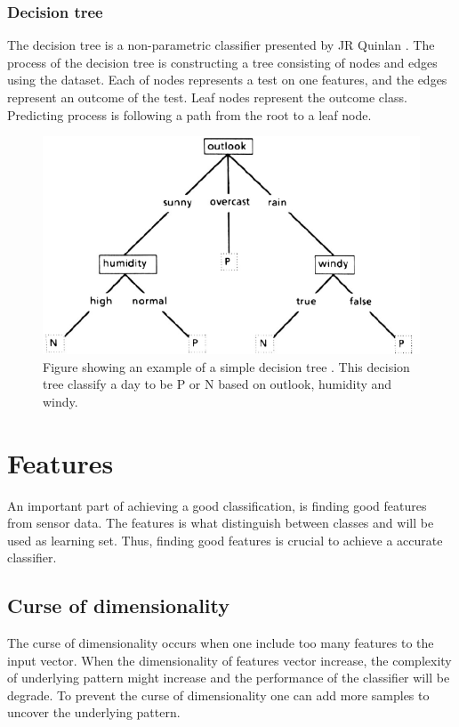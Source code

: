 \documentclass[USenglish]{ifimaster}  %
\begin{document}
	
\subsubsection{Decision tree}
The decision tree is a non-parametric classifier presented by JR Quinlan \cite{Quinlan1986}. The process of the decision tree is constructing a tree consisting of nodes and edges using the dataset. Each of nodes represents a test on one features, and the edges represent an outcome of the test. Leaf nodes represent the outcome class. Predicting process is following a path from the root to a leaf node.
	
	
\begin{figure}[h]
		\centering
		\includegraphics[scale=0.5]{Figures/decisionTree.PNG}
		\caption{Figure showing an example of a simple decision tree \cite{Quinlan1986}. This decision tree classify a day to be P or N based on outlook, humidity and windy.}
		\label{fig:SVM}
\end{figure}
	
	
\section{Features} \label{features}
An important part of achieving a good classification, is finding good features from sensor data. The features is what distinguish between classes and will be used as learning set. Thus, finding good features is crucial to achieve a accurate classifier.
	
\subsection{Curse of dimensionality}\label{curseDim}
The curse of dimensionality occurs when one include too many features to the input vector. When the dimensionality of features vector increase, the complexity of underlying pattern might increase and the performance of the classifier will be degrade. To prevent the curse of dimensionality one can add more samples to uncover the underlying pattern.
	
\end{document}

